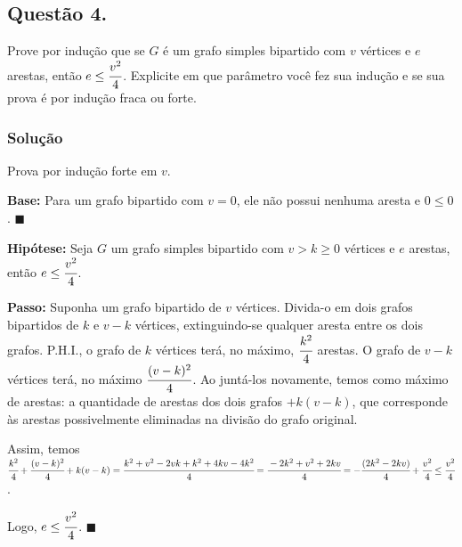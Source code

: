\documentclass[12pt, letterpaper]{report}
\newcommand*{\CQD}{\hfill\ensuremath{\blacksquare}}%
\newcounter{ProblemNum}
\newcommand*{\anyproblem}[1]{\newpage\subsection*{#1}}
\newcommand*{\problem}[1]{\stepcounter{ProblemNum} %
   \anyproblem{Questão #1}}
\newcommand*{\soln}[1]{\subsubsection*{#1}}
\newcommand*{\solution}{\soln{Solução}}
\begin{document}
\problem{4.}
    Prove por indução que se $G$ é um grafo simples bipartido com $v$ vértices e $e$ arestas, então $e \le \cfrac{v^2}{4}$. Explicite em que parâmetro você fez sua indução e se sua prova é por indução fraca ou forte.

\solution
    Prova por indução forte em $v$.

    \textbf{Base:} Para um grafo bipartido com $v = 0$, ele não possui nenhuma aresta e $0 \leq 0$. \CQD

    \textbf{Hipótese:} Seja $G$ um grafo simples bipartido com $v > k \geq 0$ vértices e $e$ arestas, então $e \le \cfrac{v^2}{4}$.

    \textbf{Passo:} Suponha um grafo bipartido de $v$ vértices. Divida-o em dois grafos bipartidos de $k$ e $v - k$ vértices, extinguindo-se qualquer aresta entre os dois grafos. P.H.I., o grafo de $k$ vértices terá, no máximo, $\cfrac{k^2}{4}$ arestas. O grafo de $v - k$ vértices terá, no máximo $\cfrac{(v - k)^2}{4}$.
    Ao juntá-los novamente, temos como máximo de arestas: a quantidade de arestas dos dois grafos $+ k(v - k)$, que corresponde às arestas possivelmente eliminadas na divisão do grafo original.
    
    Assim, temos $\cfrac{k^2}{4} + \cfrac{(v - k)^2}{4} + k(v - k) = \cfrac{k^2 + v^2 - 2vk + k^2 + 4kv - 4k^2}{4} = \cfrac{-2k^2 + v^2 + 2kv}{4} = -\cfrac{(2k^2 - 2kv)}{4} + \cfrac{v^2}{4} \leq \cfrac{v^2}{4}$.

    Logo, $e \leq \cfrac{v^2}{4}$. \CQD
\end{document}

